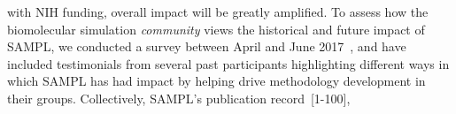 \documentclass[11pt]{article}
\begin{document}
with NIH funding, overall impact will be greatly amplified. 
To assess how the biomolecular simulation \emph{community} views the historical and future impact of SAMPL, we conducted a survey between April and June 2017~\cite{Mobley:2017:eScholarship}, and have included testimonials from several past participants highlighting different ways in which SAMPL has had impact by helping drive methodology development in their groups.
Collectively, SAMPL's publication record~[1-100],
\end{document}

